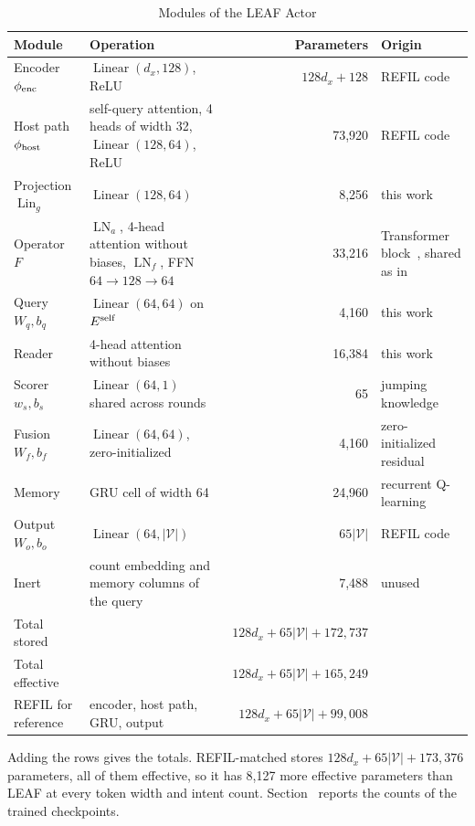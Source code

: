 \begin{table}[!t]
\centering
\scriptsize
\setlength{\tabcolsep}{3pt}
\caption{Modules of the LEAF Actor}
\label{tab:s-arch}
\begin{tabular}{@{}llrl@{}}
\toprule
Module & Operation & Parameters & Origin\\
\midrule
Encoder $\phi_{\rm enc}$ & $\operatorname{Linear}(d_x,128)$, ReLU & $128d_x+128$ & REFIL code~\cite{iqbal2021refil}\\
Host path $\phi_{\rm host}$ & self-query attention, 4 heads of width 32, $\operatorname{Linear}(128,64)$, ReLU & 73,920 & REFIL code~\cite{iqbal2021refil}\\
Projection $\operatorname{Lin}_g$ & $\operatorname{Linear}(128,64)$ & 8,256 & this work\\
Operator $F$ & $\operatorname{LN}_a$, 4-head attention without biases, $\operatorname{LN}_f$, FFN $64\to128\to64$ & 33,216 & Transformer block~\cite{vaswani2017attention}, shared as in~\cite{dehghani2019universal}\\
Query $W_q,b_q$ & $\operatorname{Linear}(64,64)$ on $E^{\rm self}$ & 4,160 & this work\\
Reader & 4-head attention without biases & 16,384 & this work\\
Scorer $w_s,b_s$ & $\operatorname{Linear}(64,1)$ shared across rounds & 65 & jumping knowledge~\cite{xu2018jk}\\
Fusion $W_f,b_f$ & $\operatorname{Linear}(64,64)$, zero-initialized & 4,160 & zero-initialized residual~\cite{bachlechner2021rezero}\\
Memory & GRU cell of width 64 & 24,960 & recurrent Q-learning~\cite{hausknecht2015drqn,cho2014gru}\\
Output $W_o,b_o$ & $\operatorname{Linear}(64,|\mathcal V|)$ & $65|\mathcal V|$ & REFIL code~\cite{iqbal2021refil}\\
Inert & count embedding and memory columns of the query & 7,488 & unused\\
\midrule
Total stored & & $128d_x+65|\mathcal V|+172{,}737$ & \\
Total effective & & $128d_x+65|\mathcal V|+165{,}249$ & \\
REFIL for reference & encoder, host path, GRU, output & $128d_x+65|\mathcal V|+99{,}008$ & \\
\bottomrule
\end{tabular}
\par\smallskip
\parbox{\textwidth}{\scriptsize Adding the rows gives the totals. REFIL-matched stores $128d_x+65|\mathcal V|+173{,}376$ parameters, all of them effective, so it has 8,127 more effective parameters than LEAF at every token width and intent count. Section~ reports the counts of the trained checkpoints.}
\end{table}

